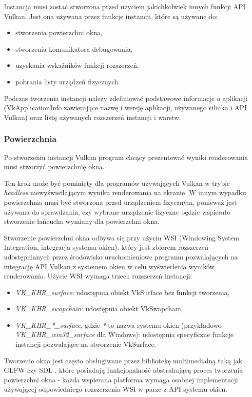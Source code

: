 Instancja musi zostać stworzona przed użyciem jakichkolwiek innych funkcji API Vulkan.
Jest ona używana przez funkcje instancji, które są używane do:
\begin{itemize}
	\item stworzenia powierzchni okna,
	\item stworzenia komunikatora debugowania,
	\item uzyskania wskaźników funkcji rozszerzeń,
	\item pobrania listy urządzeń fizycznych.
\end{itemize}

Podczas tworzenia instancji należy zdefiniować podstawowe informacje o aplikacji (VkApplicationInfo zawierające nazwę i wersję aplikacji, używanego silnika i API Vulkan) oraz listę używanych rozszerzeń instancji i warstw.

\subsubsection{Powierzchnia}

Po stworzeniu instancji Vulkan program chcący prezentować wyniki renderowania musi stworzyć powierzchnię okna.

Ten krok może być pominięty dla programów używających Vulkan w trybie \textit{headless} niewyświetlającym
wyniku renderowania na ekranie. W innym wypadku powierzchnia musi być stworzona przed urządzeniem fizycznym, ponieważ
jest używana do sprawdzania, czy wybrane urządzenie fizyczne będzie wspierało stworzenie łańcucha wymiany dla powierzchni okna.

Stworzenie powierzchni okna odbywa się przy użyciu WSI (Windowing System Integration, integracja systemu okien), który jest zbiorem rozszerzeń udostępnianych przez środowisko uruchomieniowe programu pozwalających na integrację API Vulkan z systemem okien w celu wyświetlenia wyników renderowania.
Użycie WSI wymaga trzech rozszerzeń instancji:
\begin{itemize}
	\item \textit{VK\_KHR\_surface}: udostępnia obiekt VkSurface bez funkcji tworzenia,
	\item \textit{VK\_KHR\_swapchain}: udostępnia obiekt VkSwapchain,
	\item \textit{VK\_KHR\_*\_surface}, gdzie \textit{*} to nazwa systemu okien (przykładowo \textit{VK\_KHR\_win32\_surface} dla Windows): udostępnia specyficzne funkcje instancji pozwalające na stworzenie VkSurface.
\end{itemize}
Tworzenie okna jest często obsługiwane przez bibliotekę multimedialną taką jak GLFW \cite{GLFW} czy SDL \cite{SDL}, które posiadają funkcjonalność abstrahującą proces tworzenia powierzchni okna - każda wspierana platforma wymaga osobnej implementacji używającej odpowiedniego rozszerzenia WSI w parze z API systemu okien.


